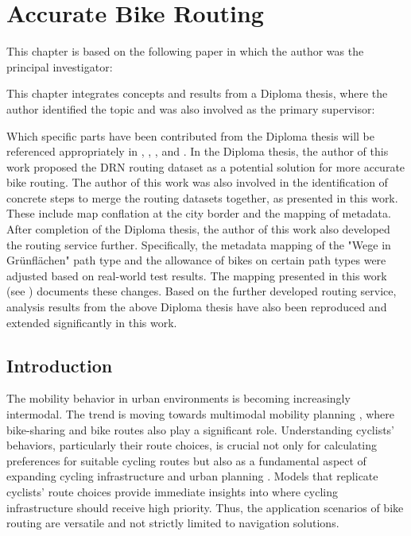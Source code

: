 \chapter{Accurate Bike Routing}\label{ch:routing}

\begin{Summary}
This chapter is based on the following paper in which the author was the principal investigator:

\cite{matthes2023accurate} 

This chapter integrates concepts and results from a Diploma thesis, where the author identified the topic and was also involved as the primary supervisor:

\cite{lorenz_2022} 

Which specific parts have been contributed from the Diploma thesis will be referenced appropriately in , , , and . In the Diploma thesis, the author of this work proposed the DRN routing dataset as a potential solution for more accurate bike routing. The author of this work was also involved in the identification of concrete steps to merge the routing datasets together, as presented in this work. These include map conflation at the city border and the mapping of metadata. After completion of the Diploma thesis, the author of this work also developed the routing service further. Specifically, the metadata mapping of the "Wege in Grünflächen" path type and the allowance of bikes on certain path types were adjusted based on real-world test results. The mapping presented in this work (see ) documents these changes. Based on the further developed routing service, analysis results from the above Diploma thesis have also been reproduced and extended significantly in this work.
\end{Summary}

\section{Introduction}

The mobility behavior in urban environments is becoming increasingly intermodal. The trend is moving towards multimodal mobility planning \cite{park_framework_2023}, where bike-sharing and bike routes also play a significant role. Understanding cyclists' behaviors, particularly their route choices, is crucial not only for calculating preferences for suitable cycling routes but also as a fundamental aspect of expanding cycling infrastructure and urban planning \cite{zielstra_comparative_2011, huber_modelling_2021}. Models that replicate cyclists' route choices provide immediate insights into where cycling infrastructure should receive high priority. Thus, the application scenarios of bike routing are versatile and not strictly limited to navigation solutions.

